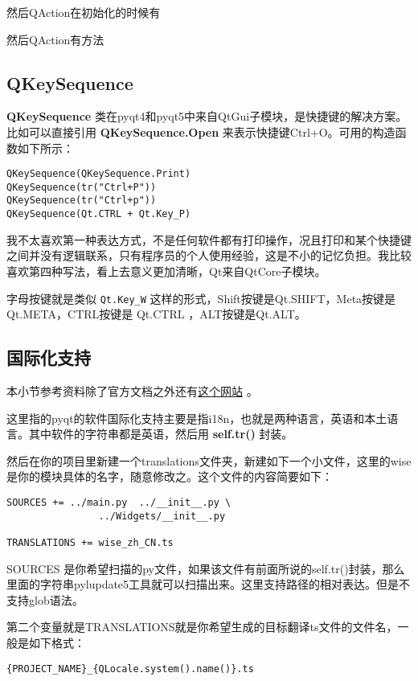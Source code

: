 \documentclass[11pt,oneside]{article}
\begin{document}
然后QAction在初始化的时候有

然后QAction有方法



\subsection{QKeySequence}
\label{sec:orgheadline42}
\textbf{QKeySequence} 类在pyqt4和pyqt5中来自QtGui子模块，是快捷键的解决方案。比如可以直接引用 \textbf{QKeySequence.Open} 来表示快捷键Ctrl+O。可用的构造函数如下所示：

\begin{Verbatim}
QKeySequence(QKeySequence.Print)
QKeySequence(tr("Ctrl+P"))
QKeySequence(tr("Ctrl+p"))
QKeySequence(Qt.CTRL + Qt.Key_P)
\end{Verbatim}


我不太喜欢第一种表达方式，不是任何软件都有打印操作，况且打印和某个快捷键之间并没有逻辑联系，只有程序员的个人使用经验，这是不小的记忆负担。我比较喜欢第四种写法，看上去意义更加清晰，Qt来自QtCore子模块。

字母按键就是类似 \texttt{Qt.Key\_W} 这样的形式，Shift按键是Qt.SHIFT，Meta按键是Qt.META，CTRL按键是        Qt.CTRL        ，ALT按键是Qt.ALT。

\subsection{国际化支持}
\label{sec:orgheadline45}
本小节参考资料除了官方文档之外还有\href{http://plashless.wordpress.com/2014/02/01/internationalizing-python-pyqt-apps/}{这个网站} 。

这里指的pyqt的软件国际化支持主要是指i18n，也就是两种语言，英语和本土语言。其中软件的字符串都是英语，然后用 \textbf{self.tr()} 封装。

然后在你的项目里新建一个translations文件夹，新建如下一个小文件，这里的wise是你的模块具体的名字，随意修改之。这个文件的内容简要如下：
\begin{Verbatim}
SOURCES += ../main.py  ../__init__.py \
                ../Widgets/__init__.py

TRANSLATIONS += wise_zh_CN.ts
\end{Verbatim}

SOURCES 是你希望扫描的py文件，如果该文件有前面所说的self.tr()封装，那么里面的字符串pylupdate5工具就可以扫描出来。这里支持路径的相对表达。但是不支持glob语法。

第二个变量就是TRANSLATIONS就是你希望生成的目标翻译ts文件的文件名，一般是如下格式：
\begin{Verbatim}
{PROJECT_NAME}_{QLocale.system().name()}.ts
\end{Verbatim}
\end{document}
